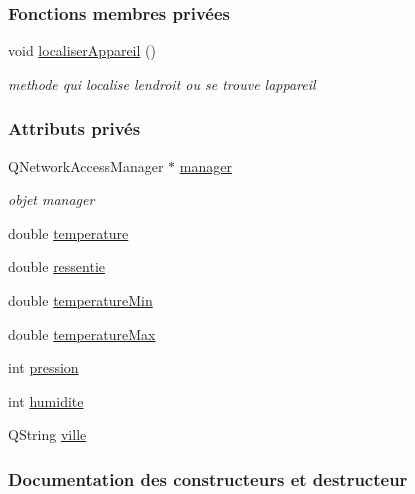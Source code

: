 \subsubsection*{Fonctions membres privées}
\begin{DoxyCompactItemize}
\item 
void \hyperlink{class_meteo_a08c48ce5f6ff05c687e570e34117f2ed}{localiser\+Appareil} ()
\begin{DoxyCompactList}\small\item\em methode qui localise l\textquotesingle{}endroit ou se trouve l\textquotesingle{}appareil \end{DoxyCompactList}\end{DoxyCompactItemize}
\subsubsection*{Attributs privés}
\begin{DoxyCompactItemize}
\item 
Q\+Network\+Access\+Manager $\ast$ \hyperlink{class_meteo_a020089a0880ff5d97df50e6a97b68f90}{manager}
\begin{DoxyCompactList}\small\item\em objet manager \end{DoxyCompactList}\item 
double \hyperlink{class_meteo_a8086970687d7df655f68775bc0852178}{temperature}
\item 
double \hyperlink{class_meteo_a405ea827846e04994ed8073f82978995}{ressentie}
\item 
double \hyperlink{class_meteo_a640f1543a82502057c333eed2c2b049e}{temperature\+Min}
\item 
double \hyperlink{class_meteo_a5dd5312470d767714779344a524fd27b}{temperature\+Max}
\item 
int \hyperlink{class_meteo_a28fe6c4ed03fcf9829dd5a8997bfb0fc}{pression}
\item 
int \hyperlink{class_meteo_ada819b35e83127ce17a51abad383f349}{humidite}
\item 
Q\+String \hyperlink{class_meteo_a20ab84130cd8c6085e665f1d7d8403a6}{ville}
\end{DoxyCompactItemize}


\subsubsection{Documentation des constructeurs et destructeur}
